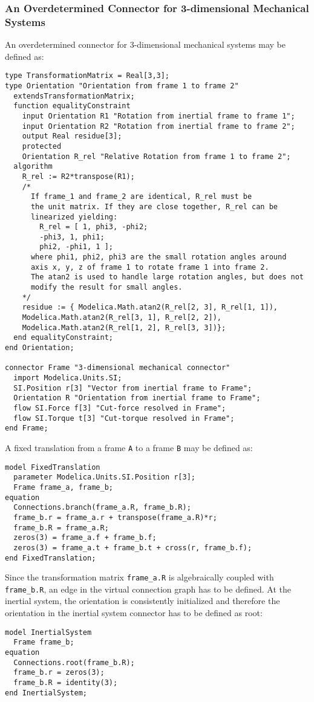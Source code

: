 \subsubsection{An Overdetermined Connector for 3-dimensional Mechanical Systems}\label{an-overdetermined-connector-for-3-dimensional-mechanical-systems}

\begin{nonnormative}
An overdetermined connector for 3-dimensional mechanical systems
may be defined as:
\begin{lstlisting}[language=modelica]
type TransformationMatrix = Real[3,3];
type Orientation "Orientation from frame 1 to frame 2"
  extendsTransformationMatrix;
  function equalityConstraint
    input Orientation R1 "Rotation from inertial frame to frame 1";
    input Orientation R2 "Rotation from inertial frame to frame 2";
    output Real residue[3];
    protected
    Orientation R_rel "Relative Rotation from frame 1 to frame 2";
  algorithm
    R_rel := R2*transpose(R1);
    /*
      If frame_1 and frame_2 are identical, R_rel must be
      the unit matrix. If they are close together, R_rel can be
      linearized yielding:
        R_rel = [ 1, phi3, -phi2;
        -phi3, 1, phi1;
        phi2, -phi1, 1 ];
      where phi1, phi2, phi3 are the small rotation angles around
      axis x, y, z of frame 1 to rotate frame 1 into frame 2.
      The atan2 is used to handle large rotation angles, but does not
      modify the result for small angles.
    */
    residue := { Modelica.Math.atan2(R_rel[2, 3], R_rel[1, 1]),
    Modelica.Math.atan2(R_rel[3, 1], R_rel[2, 2]),
    Modelica.Math.atan2(R_rel[1, 2], R_rel[3, 3])};
  end equalityConstraint;
end Orientation;

connector Frame "3-dimensional mechanical connector"
  import Modelica.Units.SI;
  SI.Position r[3] "Vector from inertial frame to Frame";
  Orientation R "Orientation from inertial frame to Frame";
  flow SI.Force f[3] "Cut-force resolved in Frame";
  flow SI.Torque t[3] "Cut-torque resolved in Frame";
end Frame;
\end{lstlisting}
A fixed translation from a frame \lstinline!A! to a frame \lstinline!B! may be defined as:
\begin{lstlisting}[language=modelica]
model FixedTranslation
  parameter Modelica.Units.SI.Position r[3];
  Frame frame_a, frame_b;
equation
  Connections.branch(frame_a.R, frame_b.R);
  frame_b.r = frame_a.r + transpose(frame_a.R)*r;
  frame_b.R = frame_a.R;
  zeros(3) = frame_a.f + frame_b.f;
  zeros(3) = frame_a.t + frame_b.t + cross(r, frame_b.f);
end FixedTranslation;
\end{lstlisting}
Since the transformation matrix \lstinline!frame_a.R! is algebraically
coupled with \lstinline!frame_b.R!, an edge in the virtual connection graph
has to be defined. At the inertial system, the orientation is
consistently initialized and therefore the orientation in the inertial
system connector has to be defined as root:
\begin{lstlisting}[language=modelica]
model InertialSystem
  Frame frame_b;
equation
  Connections.root(frame_b.R);
  frame_b.r = zeros(3);
  frame_b.R = identity(3);
end InertialSystem;
\end{lstlisting}
\end{nonnormative}
